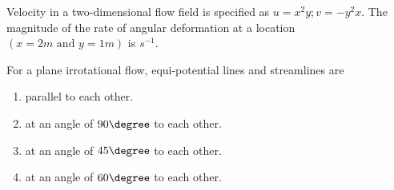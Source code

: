     \item Velocity in a two-dimensional flow field is specified as $u=x^2y;v=-y^2x$. The magnitude of the rate of angular deformation at a location $(x=2m \text{ and } y=1m)$ is \underline{\hspace{1cm}}$s^{-1}$.

    \item For a plane irrotational flow, equi-potential lines and streamlines are
        \begin{enumerate}
            \item parallel to each other.
            \item at an angle of $90\degree$ to each other.
            \item at an angle of $45\degree$ to each other.
            \item at an angle of $60\degree$ to each other.
        \end{enumerate}


